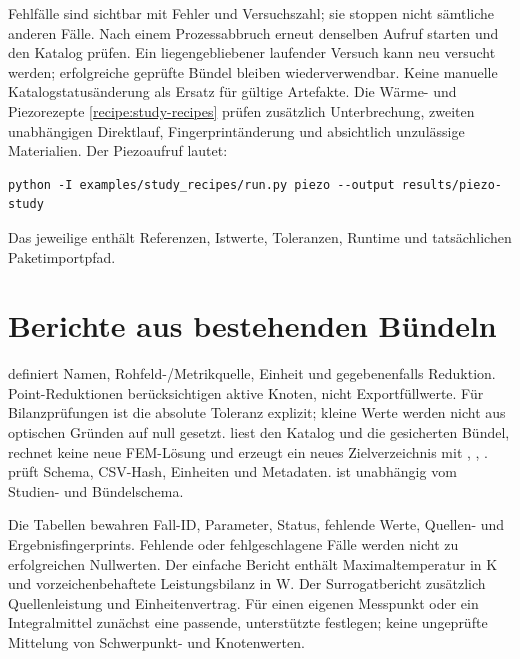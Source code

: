 Fehlfälle sind sichtbar mit Fehler und Versuchszahl; sie stoppen nicht
sämtliche anderen Fälle. Nach einem Prozessabbruch erneut denselben Aufruf
starten und den Katalog prüfen. Ein liegengebliebener laufender Versuch kann
neu versucht werden; erfolgreiche geprüfte Bündel bleiben wiederverwendbar.
Keine manuelle Katalogstatusänderung als Ersatz für gültige Artefakte.
Die Wärme- und Piezorezepte \ref{recipe:study-recipes} prüfen zusätzlich
Unterbrechung, zweiten unabhängigen Direktlauf, Fingerprintänderung und
absichtlich unzulässige Materialien. Der Piezoaufruf lautet:
\begin{lstlisting}
python -I examples/study_recipes/run.py piezo --output results/piezo-study
\end{lstlisting}
Das jeweilige  enthält Referenzen, Istwerte,
Toleranzen, Runtime und tatsächlichen Paketimportpfad.

\section{Berichte aus bestehenden Bündeln}
 definiert Namen, Rohfeld-/Metrikquelle, Einheit und
gegebenenfalls Reduktion. Point-Reduktionen berücksichtigen aktive Knoten,
nicht Exportfüllwerte. Für Bilanzprüfungen ist die absolute Toleranz explizit;
kleine Werte werden nicht aus optischen Gründen auf null gesetzt.
 liest den Katalog und die gesicherten Bündel,
rechnet keine neue FEM-Lösung und erzeugt ein neues Zielverzeichnis mit
, , .
 prüft Schema, CSV-Hash, Einheiten und Metadaten.
 ist unabhängig vom Studien- und Bündelschema.

Die Tabellen bewahren Fall-ID, Parameter, Status, fehlende Werte, Quellen-
und Ergebnisfingerprints. Fehlende oder fehlgeschlagene Fälle werden nicht
zu erfolgreichen Nullwerten. Der einfache Bericht enthält Maximaltemperatur
in K und vorzeichenbehaftete Leistungsbilanz in W. Der Surrogatbericht
zusätzlich Quellenleistung und Einheitenvertrag. Für einen eigenen Messpunkt
oder ein Integralmittel zunächst eine passende, unterstützte 
festlegen; keine ungeprüfte Mittelung von Schwerpunkt- und Knotenwerten.

